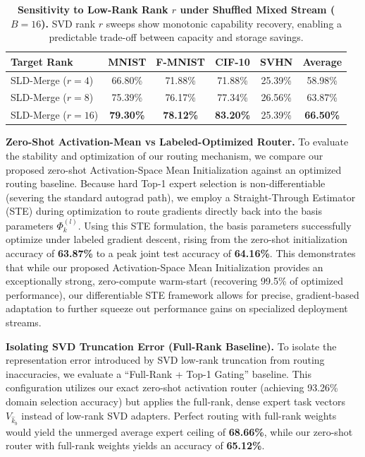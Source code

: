 \begin{table}[t]
\caption{\textbf{Sensitivity to Low-Rank Rank $r$ under Shuffled Mixed Stream ($B=16$).} SVD rank $r$ sweeps show monotonic capability recovery, enabling a predictable trade-off between capacity and storage savings.}
\label{tab:rank_ablation}
\vskip 0.15in
\begin{center}
\begin{small}
\begin{sc}
\setlength{\tabcolsep}{3pt}
\begin{tabular}{lccccc}
\toprule
Target Rank & MNIST & F-MNIST & CIF-10 & SVHN & Average \\
\midrule
SLD-Merge ($r=4$)  & 66.80\% & 71.88\% & 71.88\% & 25.39\% & 58.98\% \\
SLD-Merge ($r=8$)  & 75.39\% & 76.17\% & 77.34\% & 26.56\% & 63.87\% \\
SLD-Merge ($r=16$) & \textbf{79.30\%} & \textbf{78.12\%} & \textbf{83.20\%} & 25.39\% & \textbf{66.50\%} \\
\bottomrule
\end{tabular}
\end{sc}
\end{small}
\end{center}
\vskip -0.1in
\end{table}

\textbf{Zero-Shot Activation-Mean vs Labeled-Optimized Router.}
To evaluate the stability and optimization of our routing mechanism, we compare our proposed zero-shot Activation-Space Mean Initialization against an optimized routing baseline. Because hard Top-1 expert selection is non-differentiable (severing the standard autograd path), we employ a Straight-Through Estimator (STE) during optimization to route gradients directly back into the basis parameters $\Phi_k^{(l)}$. Using this STE formulation, the basis parameters successfully optimize under labeled gradient descent, rising from the zero-shot initialization accuracy of \textbf{63.87\%} to a peak joint test accuracy of \textbf{64.16\%}. This demonstrates that while our proposed Activation-Space Mean Initialization provides an exceptionally strong, zero-compute warm-start (recovering 99.5\% of optimized performance), our differentiable STE framework allows for precise, gradient-based adaptation to further squeeze out performance gains on specialized deployment streams.

\textbf{Isolating SVD Truncation Error (Full-Rank Baseline).}
To isolate the representation error introduced by SVD low-rank truncation from routing inaccuracies, we evaluate a ``Full-Rank + Top-1 Gating'' baseline. This configuration utilizes our exact zero-shot activation router (achieving 93.26\% domain selection accuracy) but applies the full-rank, dense expert task vectors $V_{\hat{k}_b}$ instead of low-rank SVD adapters. Perfect routing with full-rank weights would yield the unmerged average expert ceiling of \textbf{68.66\%}, while our zero-shot router with full-rank weights yields an accuracy of \textbf{65.12\%}. 

